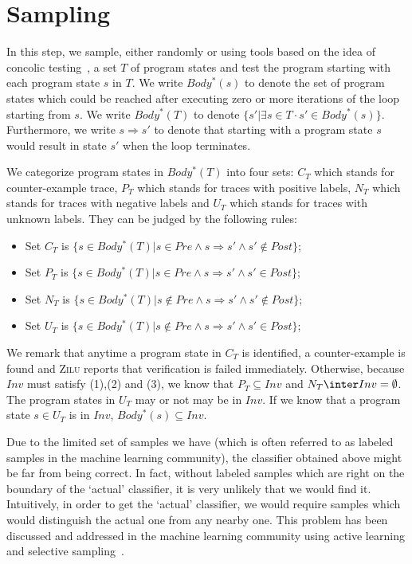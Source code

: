 
\section{Sampling}
In this step, we sample, either randomly or using tools based on the idea of concolic testing~\cite{}, 
a set $T$ of program states and test the program starting with each program state $s$ in $T$. 
We write $Body^*(s)$ to denote the set of program states which could be reached after executing zero or more iterations of the loop starting from $s$. 
We write $Body^*(T)$ to denote $\{s' | \exists s \in T \cdot s' \in Body^*(s)\}$. 
Furthermore, we write $s \Rightarrow s'$ to denote that starting with a program state $s$ would result in state $s'$ when the loop terminates. 

We categorize program states in $Body^*(T)$ into four sets:
$C_T$ which stands for counter-example trace, 
$P_T$ which stands for traces with positive labels, 
$N_T$ which stands for traces with negative labels 
and $U_T$ which stands for traces with unknown labels.
They can be judged by the following rules: 
\begin{itemize}
    \item Set $C_T$ is $\{s \in Body^*(T) | s \in Pre \land s \Rightarrow s' \land s' \nin Post\}$;
    \item Set $P_T$ is $\{s \in Body^*(T) | s \in Pre \land s \Rightarrow s' \land s' \in Post\}$;
    \item Set $N_T$ is $\{s \in Body^*(T) | s \nin Pre \land s \Rightarrow s' \land s' \nin Post\}$;
    \item Set $U_T$ is $\{s \in Body^*(T) | s \nin Pre \land s \Rightarrow s' \land s' \in Post\}$;
\end{itemize}
We remark that anytime a program state in $C_T$ is identified, a counter-example is found and \textsc{Zilu} reports that verification is failed immediately. 
Otherwise, because $Inv$ must satisfy (1),(2) and (3), we know that $P_T \subseteq Inv$ and $N_T \inter Inv = \emptyset$. 
The program states in $U_T$ may or not may be in $Inv$. 
If we know that a program state $s \in U_T$ is in $Inv$, $Body^*(s) \subseteq Inv$.



Due to the limited set of samples we have (which is often referred to as labeled samples in the machine learning community), 
the classifier obtained above might be far from being correct. 
In fact, without labeled samples which are right on the boundary of the `actual' classifier, 
it is very unlikely that we would find it. 
Intuitively, in order to get the `actual' classifier, we would require samples which would distinguish the actual one from any nearby one. 
This problem has been discussed and addressed in the machine learning community using active learning and selective sampling~\cite{DBLP:conf/icml/SchohnC00}.

